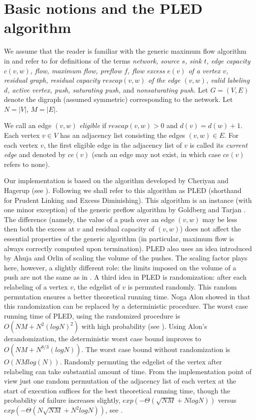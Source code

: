 \section{Basic notions and the PLED algorithm}
We assume that the reader is familiar with the generic maximum flow
algorithm in \cite{GT88} and refer to \cite{GT88} for definitions of
the terms {\sl network, source $s$, sink $t$, edge capacity $c(v, w)$, 
flow,
maximum flow, preflow $f$, flow excess $e(v)$ of a vertex $v$, residual
graph, residual capacity $rescap(v, w)$ of the edge $(v, w)$, valid
labeling $d$, active vertex, push, saturating push, } and {\sl
nonsaturating push.} Let $G = (V, E)$ denote the digraph (assumed
symmetric) corresponding to the network. Let $N = |V|$, $M = |E|$. 

We call an edge $(v, w)$ {\sl eligible} if $rescap(v, w) > 0$ and
$d(v) = d(w) + 1$. Each vertex $v \in V$ has an adjacency list
consisting the edges $(v,w) \in E$. For each vertex $v$, the first
eligible edge in the adjacency list of $v$ is called its {\sl current edge}
and denoted by $ce(v)$ 
(such an edge may not exist, in which case $ce(v)$ refers to none).

Our implementation is based on the algorithm developed
by Cheriyan and Hagerup (see \cite{CH}). Following \cite{CH} we shall
refer to this algorithm as PLED (shorthand for Prudent Linking and
Excess Diminishing). This algorithm is an instance (with one minor
exception) of the generic preflow algorithm by Goldberg and Tarjan
\cite{GT88}. The difference (namely, the value of a push over an edge
$(v,w)$ may be less then both the excess at $v$ and residual capacity
of $(v,w)$) does not affect the  essential properties of the generic
algorithm (in particular, maximum flow is always correctly computed
upon termination). PLED also uses an 
idea introduced by Ahuja and Orlin \cite{AO} of scaling the volume of
the pushes. The scaling factor plays here, however, a 
slightly different role: the limits imposed on the volume of a push
are not the same as in \cite{AO}. 
A third idea in PLED is randomization: after each relabeling of a
vertex $v$, the edgelist of $v$ is permuted randomly. This random
permutation ensures a better theoretical running time.
Noga Alon showed in \cite{NA} that this randomization can be replaced
by a deterministic procedure. 
The worst case running time of PLED, using the randomized
procedure is $O(NM + N^{2}(logN)^{2})$ with high probability (see
\cite{C1,C2,C3}). 
Using Alon's derandomization, the deterministic worst case bound
improves to $O(NM+ N^{8/3}(logN))$. 
The worst case bound without randomization is $O(NMlog(N))$. 
Randomly permuting the edgelist of the vertex after relabeling can
take substantial amount of time. From the implementation point of view
just one random permutation of the adjacency list of each vertex at
the start of execution suffices for the best theoretical running time,
though the probability of failure increases slightly,
$exp(-\Theta(\sqrt{NM} + NlogN))$ versus $exp(-\Theta(N\sqrt{NM} +
N^2logN))$, see \cite{CH,C1}. 

